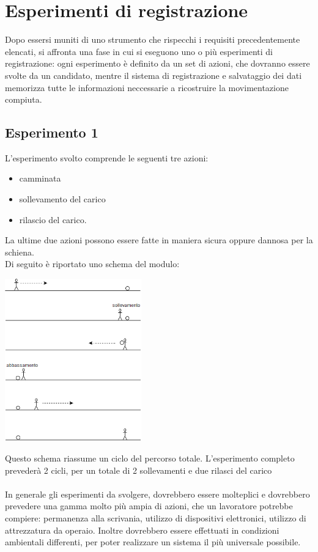 \documentclass[a4paper, oneside]{book}
\begin{document}
	\section{Esperimenti di registrazione}
Dopo essersi muniti di uno strumento che rispecchi i requisiti precedentemente elencati, si  affronta una fase in cui si eseguono uno o più esperimenti di registrazione: ogni esperimento è definito da un set di azioni, che dovranno essere svolte da un candidato, mentre il sistema di registrazione e salvataggio dei dati memorizza tutte le informazioni neccessarie a ricostruire la movimentazione compiuta.

	\subsection{Esperimento 1}
L’esperimento svolto comprende le seguenti tre azioni:
\begin {itemize}
\item camminata
\item sollevamento del carico 
\item rilascio del carico.
\end{itemize}
La ultime due azioni possono essere fatte in maniera sicura oppure dannosa per la schiena. \\
Di seguito è riportato uno schema del modulo:\\

\vspace{3mm}
\begin{minipage}{\linewidth}
\begin{center}
\includegraphics[width=59mm,scale=0.7]{./images/esperimento1.png} 
\vspace{3mm}
\end{center}
\end{minipage}
Questo schema riassume un ciclo del percorso totale. L’esperimento completo prevederà 2 cicli, per un totale di 2 sollevamenti e due rilasci del carico\\ \\
In generale gli esperimenti da svolgere, dovrebbero essere molteplici e dovrebbero prevedere una gamma molto più ampia di azioni, che un lavoratore potrebbe compiere: permanenza alla scrivania, utilizzo di dispositivi elettronici, utilizzo di attrezzatura da operaio. Inoltre dovrebbero essere effettuati in condizioni ambientali differenti, per poter realizzare un sistema il più universale possibile.
\end{document}
